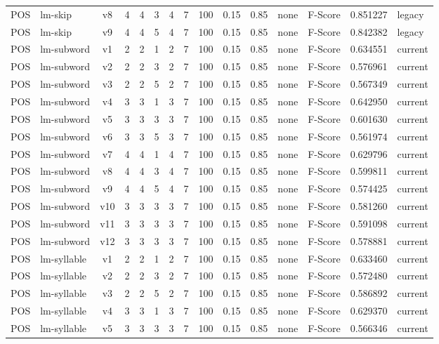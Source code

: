 \documentclass{article}
\begin{document}
\begin{xltabular}{\linewidth}{@{}lYcrrrrrrrrYlrl@{}}
POS & lm-skip & v8 & 4 & 4 & 3 & 4 & 7 & 100 & 0.15 & 0.85 & none & F-Score & 0.851227 & legacy \\
POS & lm-skip & v9 & 4 & 4 & 5 & 4 & 7 & 100 & 0.15 & 0.85 & none & F-Score & 0.842382 & legacy \\
POS & lm-subword & v1 & 2 & 2 & 1 & 2 & 7 & 100 & 0.15 & 0.85 & none & F-Score & 0.634551 & current \\
POS & lm-subword & v2 & 2 & 2 & 3 & 2 & 7 & 100 & 0.15 & 0.85 & none & F-Score & 0.576961 & current \\
POS & lm-subword & v3 & 2 & 2 & 5 & 2 & 7 & 100 & 0.15 & 0.85 & none & F-Score & 0.567349 & current \\
POS & lm-subword & v4 & 3 & 3 & 1 & 3 & 7 & 100 & 0.15 & 0.85 & none & F-Score & 0.642950 & current \\
POS & lm-subword & v5 & 3 & 3 & 3 & 3 & 7 & 100 & 0.15 & 0.85 & none & F-Score & 0.601630 & current \\
POS & lm-subword & v6 & 3 & 3 & 5 & 3 & 7 & 100 & 0.15 & 0.85 & none & F-Score & 0.561974 & current \\
POS & lm-subword & v7 & 4 & 4 & 1 & 4 & 7 & 100 & 0.15 & 0.85 & none & F-Score & 0.629796 & current \\
POS & lm-subword & v8 & 4 & 4 & 3 & 4 & 7 & 100 & 0.15 & 0.85 & none & F-Score & 0.599811 & current \\
POS & lm-subword & v9 & 4 & 4 & 5 & 4 & 7 & 100 & 0.15 & 0.85 & none & F-Score & 0.574425 & current \\
POS & lm-subword & v10 & 3 & 3 & 3 & 3 & 7 & 100 & 0.15 & 0.85 & none & F-Score & 0.581260 & current \\
POS & lm-subword & v11 & 3 & 3 & 3 & 3 & 7 & 100 & 0.15 & 0.85 & none & F-Score & 0.591098 & current \\
POS & lm-subword & v12 & 3 & 3 & 3 & 3 & 7 & 100 & 0.15 & 0.85 & none & F-Score & 0.578881 & current \\
POS & lm-syllable & v1 & 2 & 2 & 1 & 2 & 7 & 100 & 0.15 & 0.85 & none & F-Score & 0.633460 & current \\
POS & lm-syllable & v2 & 2 & 2 & 3 & 2 & 7 & 100 & 0.15 & 0.85 & none & F-Score & 0.572480 & current \\
POS & lm-syllable & v3 & 2 & 2 & 5 & 2 & 7 & 100 & 0.15 & 0.85 & none & F-Score & 0.586892 & current \\
POS & lm-syllable & v4 & 3 & 3 & 1 & 3 & 7 & 100 & 0.15 & 0.85 & none & F-Score & 0.629370 & current \\
POS & lm-syllable & v5 & 3 & 3 & 3 & 3 & 7 & 100 & 0.15 & 0.85 & none & F-Score & 0.566346 & current \\

\end{xltabular}
\end{document}
